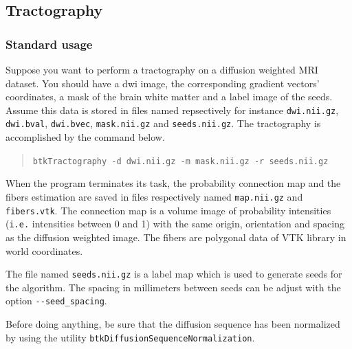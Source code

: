 \subsection{Tractography \cite{pontabry_probabilistic_2011}}
\label{subsec:tracto}

    \subsubsection*{Standard usage}
        Suppose you want to perform a tractography on a diffusion weighted MRI 
dataset. You should have a dwi image, the corresponding gradient vectors'
coordinates, a mask of the brain white matter and a label image of the seeds.
Assume this data is stored in files named repsectively for instance
\texttt{dwi.nii.gz}, \texttt{dwi.bval}, \texttt{dwi.bvec}, \texttt{mask.nii.gz} and
\texttt{seeds.nii.gz}. The tractography is accomplished by the command below.
            \begin{quote}
                \texttt{btkTractography -d dwi.nii.gz -m mask.nii.gz -r seeds.nii.gz}
            \end{quote}
        When the program terminates its task, the probability connection map and
        the fibers estimation are saved in files respectively named
\texttt{map.nii.gz} and \texttt{fibers.vtk}. The connection map is a volume
image of probability intensities (\texttt{i.e.} intensities between 0 and 1)
with the same origin, orientation and spacing as the diffusion weighted image.
The fibers are polygonal data of VTK library in world coordinates.

        The file named \texttt{seeds.nii.gz} is a label map which is used to 
        generate seeds for the algorithm. The spacing in millimeters between
seeds can be adjust with the option \texttt{-\hspace{0.1mm}-seed\_spacing}.

        Before doing anything, be sure that the diffusion sequence has been normalized by using the utility \texttt{btkDiffusionSequenceNormalization}.
        
